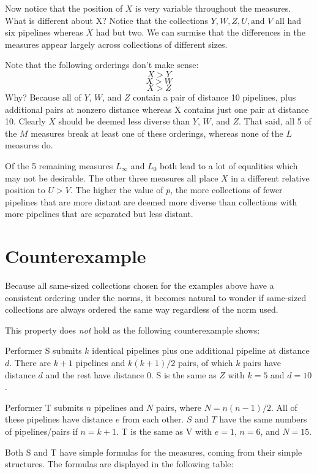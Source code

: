 \documentclass{article}
\begin{document}
Now notice that the position of $X$ is very variable throughout the
measures.  What is different about X?  Notice that the collections $Y,
W, Z, U, \mbox{and } V$ all had six pipelines whereas $X$ had but two.
We can surmise that the differences in the measures appear largely
across collections of different sizes.

Note that the following orderings don't make sense:
$$X > Y$$
$$X > W$$
$$X > Z$$ Why?  Because all of $Y$, $W$, and $Z$ contain a pair of
distance 10 pipelines, plus additional pairs at nonzero distance
whereas X contains just one pair at distance 10.  Clearly $X$ should
be deemed less diverse than $Y$, $W$, and $Z$.  That said, all 5 of
the $M$ measures break at least one of these orderings, whereas none
of the $L$ measures do.

Of the 5 remaining measures $L_\infty$ and $L_0$ both lead to a lot of
equalities which may not be desirable.  The other three measures all
place $X$ in a different relative position to $U > V$.  The higher the
value of $p$, the more collections of fewer pipelines that are more
distant are deemed more diverse than collections with more pipelines
that are separated but less distant.

\section{Counterexample}
Because all same-sized collections chosen for the examples above have
a consistent ordering under the norms, it becomes natural to wonder if
same-sized collections are always ordered the same way regardless of
the norm used.

This property does \emph{not} hold as the following counterexample
shows:

Performer S submits $k$ identical pipelines plus one additional
pipeline at distance $d$.  There are $k+1$ pipelines and $k (k+1)/2$
pairs, of which $k$ pairs have distance $d$ and the rest have distance
0.  S is the same as $Z$ with $k = 5$ and $d = 10$.

Performer T submits $n$ pipelines and $N$ pairs, where $N = n (n-1) /
2$.  All of these pipelines have distance $e$ from each other.  $S$
and $T$ have the same numbers of pipelines/pairs if $n = k+1$.  T is
the same as V with $e = 1$, $n = 6$, and $N = 15$.

Both S and T have simple formulas for the measures, coming from their
simple structures.  The formulas are displayed in the following table:
\end{document}
